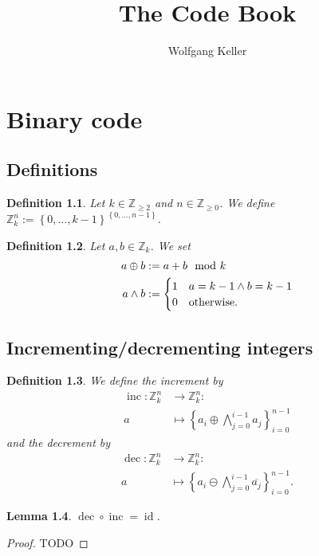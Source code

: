 \documentclass[10pt,a4paper,BCOR = 12mm,DIV=15]{scrbook}
\author{Wolfgang Keller}
\title{The Code Book}
\newtheorem{Def}{Definition}
\newtheorem{Le}[Def]{Lemma}
\newcommand{\id}{\operatorname{id}}
\newcommand{\inc}{\operatorname{inc}}
\newcommand{\dec}{\operatorname{dec}}
\begin{document}
\chapter{Binary code}

\section{Definitions}

\begin{Def}
Let $k \in \mathbb{Z}_{\geq 2}$ and $n \in \mathbb{Z}_{\geq 0}$. We define $\mathbb{Z}_k^n := \left\{0, \ldots, k-1\right\}^{\left\{0, \ldots, n-1\right\}}$.
\end{Def}

\begin{Def}
Let $a, b \in \mathbb{Z}_k$. We set
\begin{align*}
a \oplus b & := a + b \mod k \\
a \wedge b & := \begin{cases}
1 & a=k-1 \wedge b=k-1 \\
0 & \textnormal{otherwise.}
\end{cases}
\end{align*}
\end{Def}

\section{Incrementing/decrementing integers}

\begin{Def}
We define the \emph{increment} by
\begin{align*}
\inc: \mathbb{Z}_k^n & \rightarrow \mathbb{Z}_k^n: \\
a & \mapsto \left\{a_i \oplus \bigwedge_{j=0}^{i-1} a_j\right\}_{i=0}^{n-1}
\end{align*}
and the \emph{decrement} by
\begin{align*}
\dec: \mathbb{Z}_k^n & \rightarrow \mathbb{Z}_k^n: \\
a & \mapsto \left\{a_i \ominus \bigwedge_{j=0}^{i-1} \overline{a_j}\right\}_{i=0}^{n-1}.
\end{align*}
\end{Def}

\begin{Le}
$\dec \circ \inc = \id$.
\end{Le}
\begin{proof}
TODO
\end{proof}
\end{document}
